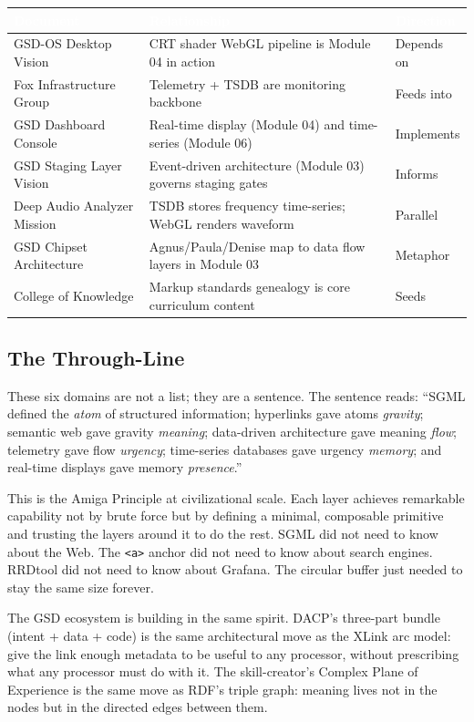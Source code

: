 \documentclass[11pt,letterpaper]{article}
\newcommand{\tableheader}[1]{\textbf{\sffamily\textcolor{white}{#1}}}
\begin{document}
\begin{center}
\begin{tabularx}{\textwidth}{L{4cm}XC{2.5cm}}
\toprule
{}
\tableheader{Document} & \tableheader{Relationship} & \tableheader{Direction} \\
\midrule
GSD-OS Desktop Vision & CRT shader WebGL pipeline is Module 04 in action & Depends on \\
Fox Infrastructure Group & Telemetry + TSDB are monitoring backbone & Feeds into \\
GSD Dashboard Console & Real-time display (Module 04) and time-series (Module 06) & Implements \\
GSD Staging Layer Vision & Event-driven architecture (Module 03) governs staging gates & Informs \\
Deep Audio Analyzer Mission & TSDB stores frequency time-series; WebGL renders waveform & Parallel \\
GSD Chipset Architecture & Agnus/Paula/Denise map to data flow layers in Module 03 & Metaphor \\
College of Knowledge & Markup standards genealogy is core curriculum content & Seeds \\
\bottomrule
\end{tabularx}
\end{center}

\subsection{The Through-Line}

These six domains are not a list; they are a sentence. The sentence reads: ``SGML defined the \emph{atom} of structured information; hyperlinks gave atoms \emph{gravity}; semantic web gave gravity \emph{meaning}; data-driven architecture gave meaning \emph{flow}; telemetry gave flow \emph{urgency}; time-series databases gave urgency \emph{memory}; and real-time displays gave memory \emph{presence}.''

This is the Amiga Principle at civilizational scale. Each layer achieves remarkable capability not by brute force but by defining a minimal, composable primitive and trusting the layers around it to do the rest. SGML did not need to know about the Web. The \texttt{<a>} anchor did not need to know about search engines. RRDtool did not need to know about Grafana. The circular buffer just needed to stay the same size forever.

The GSD ecosystem is building in the same spirit. DACP's three-part bundle (intent + data + code) is the same architectural move as the XLink arc model: give the link enough metadata to be useful to any processor, without prescribing what any processor must do with it. The skill-creator's Complex Plane of Experience is the same move as RDF's triple graph: meaning lives not in the nodes but in the directed edges between them.
\end{document}
